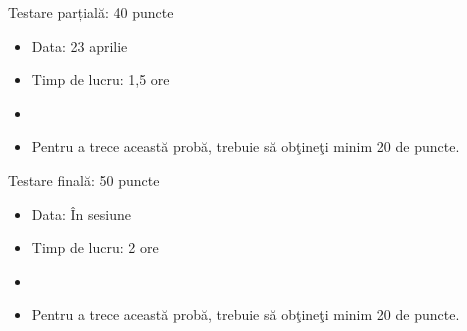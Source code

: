 \documentclass[xcolor=x11names,compress,10pt]{beamer}
\begin{document}
\begin{frame}{Testare parțială: 40 puncte}

		\begin{itemize}
			\vspace{.1cm}
			\item Data: 23 aprilie
			\vspace{.1cm}
			\item Timp de lucru: 1,5 ore
			\vspace{.1cm}
			\item {}
			
			\vspace{.1cm}
			\item Pentru a trece aceast\u a prob\u a, trebuie s\u a ob\c tine\c ti minim  20 de puncte.
			
%			
		\end{itemize}

\end{frame}

\begin{frame}{Testare finală: 50 puncte}
\begin{itemize}
	\item Data: În sesiune
	\vspace{.1cm}
	\item Timp de lucru: 2 ore
	\vspace{.1cm}
	\item {}
	\vspace{.1cm}
	\item Pentru a trece aceast\u a prob\u a, trebuie s\u a 
	ob\c tine\c ti minim 20 de puncte.
\end{itemize}	
\end{frame}
\end{document}
